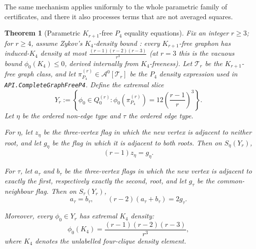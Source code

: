 \documentclass[11pt]{article}
\newtheorem{theorem}{Theorem}
\theoremstyle{definition}
\newcommand{\A}{\mathcal{A}}
\newcommand{\T}{\mathcal{T}}
\begin{document}
The same mechanism applies uniformly to the whole parametric family of certificates, and
there it also processes terms that are not averaged squares.

\begin{theorem}[Parametric $K_{r+1}$-free $P_4$ equality equations]
\label{thm:parametric-p4-equality-slice}
Fix an integer $r\ge3$; for $r\ge4$, assume Zykov's $K_4$-density \emph{bound}
\cite{Zykov1949}: every $K_{r+1}$-free graphon has induced-$K_4$ density at most
$\frac{(r-1)(r-2)(r-3)}{r^3}$ (at $r=3$ this is the vacuous bound $\phi_0(K_4)\le0$,
derived internally from $K_4$-freeness).  Let $\T_r$ be the $K_{r+1}$-free graph class, and
let $\pi_{P_4}^{(r)}\in\A^0[\T_r]$ be the $P_4$ density expression used in
\texttt{API.CompleteGraphFreeP4}.  Define the extremal slice
\[
  Y_r:=\left\{\phi_0\in Q_0^{(r)}:
    \phi_0(\pi_{P_4}^{(r)})=12\left(\frac{r-1}{r}\right)^3\right\}.
\]
Let $\eta$ be the ordered non-edge type and $\tau$ the ordered edge type.

For $\eta$, let $z_\eta$ be the three-vertex flag in which the new vertex is adjacent
to neither root, and let $g_\eta$ be the flag in which it is adjacent to both roots.
Then on $S_\eta(Y_r)$,
\[
  (r-1)z_\eta=g_\eta .
\]

For $\tau$, let $a_\tau$ and $b_\tau$ be the three-vertex flags in which the new
vertex is adjacent to exactly the first, respectively exactly the second, root, and let
$g_\tau$ be the common-neighbour flag.  Then on $S_\tau(Y_r)$,
\[
  a_\tau=b_\tau,
  \qquad
  (r-2)(a_\tau+b_\tau)=2g_\tau .
\]

Moreover, every $\phi_0\in Y_r$ has extremal $K_4$ density:
\[
  \phi_0(K_4)=\frac{(r-1)(r-2)(r-3)}{r^3},
\]
where $K_4$ denotes the unlabelled four-clique density element.
\end{theorem}
\end{document}
